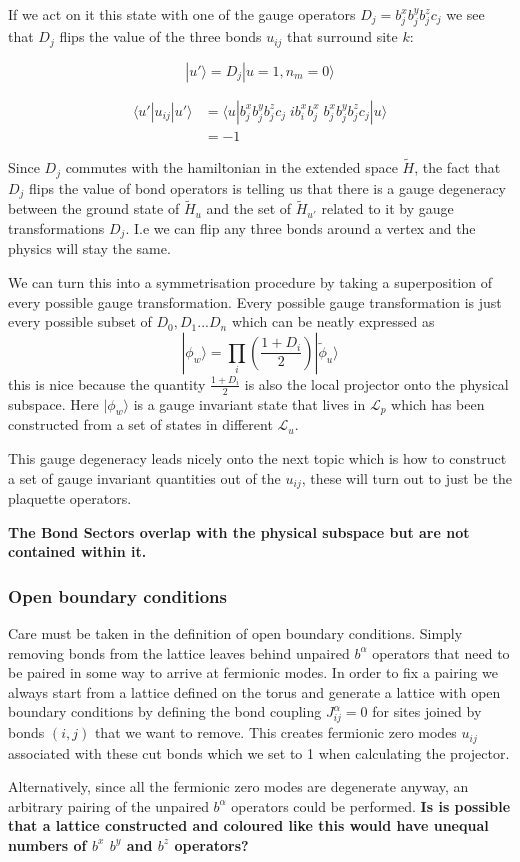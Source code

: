 If we act on it this state with one of the gauge operators \(D_j = b_j^x b_j^y b_j^z c_j\) we see that \(D_j\) flips the value of the three bonds \(u_{ij}\) that surround site \(k\):

\[ |u'\rangle = D_j |u=1, n_m = 0\rangle\]

\[ \begin{aligned}
\langle u'|u_{ij}|u'\rangle &=  \langle u| b_j^x b_j^y b_j^z c_j \;ib^x_i b^x_j\; b_j^x b_j^y b_j^z c_j|u\rangle\\
&= -1
\end{aligned}\]

Since \(D_j\) commutes with the hamiltonian in the extended space \(\tilde{H}\), the fact that \(D_j\) flips the value of bond operators is telling us that there is a gauge degeneracy between the ground state of \(\tilde{H}_u\) and the set of \(\tilde{H}_{u'}\) related to it by gauge transformations \(D_j\). I.e we can flip any three bonds around a vertex and the physics will stay the same.

We can turn this into a symmetrisation procedure by taking a superposition of every possible gauge transformation. Every possible gauge transformation is just every possible subset of \({D_0, D_1 ... D_n}\) which can be neatly expressed as \[|\phi_w\rangle = \prod_i \left( \frac{1 + D_i}{2}\right) |\tilde{\phi}_u\rangle\] this is nice because the quantity \(\frac{1 + D_i}{2}\) is also the local projector onto the physical subspace. Here \(|\phi_w\rangle\) is a gauge invariant state that lives in \(\mathcal{L}_p\) which has been constructed from a set of states in different \(\mathcal{L}_u\).

This gauge degeneracy leads nicely onto the next topic which is how to construct a set of gauge invariant quantities out of the \(u_{ij}\), these will turn out to just be the plaquette operators.

\textbf{The Bond Sectors overlap with the physical subspace but are not contained within it.}

\hypertarget{open-boundary-conditions}{%
\subsubsection{Open boundary conditions}\label{open-boundary-conditions}}

Care must be taken in the definition of open boundary conditions. Simply removing bonds from the lattice leaves behind unpaired \(b^\alpha\) operators that need to be paired in some way to arrive at fermionic modes. In order to fix a pairing we always start from a lattice defined on the torus and generate a lattice with open boundary conditions by defining the bond coupling \(J^{\alpha}_{ij} = 0\) for sites joined by bonds \((i,j)\) that we want to remove. This creates fermionic zero modes \(u_{ij}\) associated with these cut bonds which we set to 1 when calculating the projector.

Alternatively, since all the fermionic zero modes are degenerate anyway, an arbitrary pairing of the unpaired \(b^\alpha\) operators could be performed. \textbf{Is is possible that a lattice constructed and coloured like this would have unequal numbers of \(b^x\) \(b^y\) and \(b^z\) operators?}
